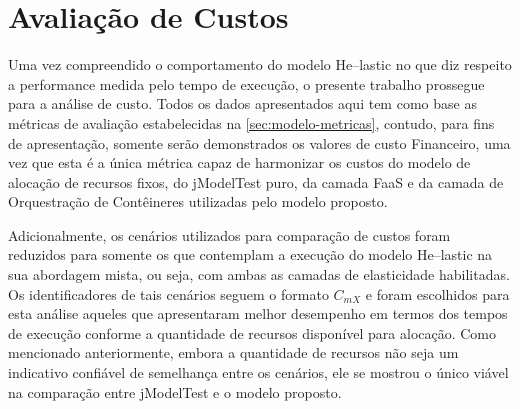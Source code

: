 \documentclass[english,brazilian]{UNISINOSmonografia} %
\begin{document}








\section{Avaliação de Custos}



Uma vez compreendido o comportamento do modelo \textsf{He}--lastic no que diz respeito a performance medida pelo tempo de execução, o presente trabalho prossegue para a análise de custo.
%
Todos os dados apresentados aqui tem como base as métricas de avaliação estabelecidas na \autoref{sec:modelo-metricas}, contudo, para fins de apresentação, somente serão demonstrados os valores de custo Financeiro, uma vez que esta é a única métrica capaz de harmonizar os custos do modelo de alocação de recursos fixos, do jModelTest puro, da camada FaaS e da camada de Orquestração de Contêineres utilizadas pelo modelo proposto.



Adicionalmente, os cenários utilizados para comparação de custos foram reduzidos para somente os que contemplam a execução do modelo \textsf{He}--lastic na sua abordagem mista, ou seja, com ambas as camadas de elasticidade habilitadas.
%
Os identificadores de tais cenários seguem o formato $C_{mX}$ e foram escolhidos para esta análise aqueles que apresentaram melhor desempenho em termos dos tempos de execução conforme a quantidade de recursos disponível para alocação.
%
Como mencionado anteriormente, embora a quantidade de recursos não seja um indicativo confiável de semelhança entre os cenários, ele se mostrou o único viável na comparação entre jModelTest e o modelo proposto.
\end{document}
